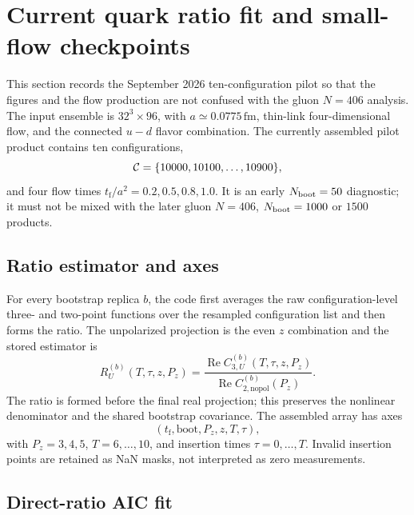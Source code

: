 \documentclass[11pt]{article}
\numberwithin{equation}{section}
\newcommand{\tf}{t_{\mathrm f}}
\begin{document}
\section{Current quark ratio fit and small-flow checkpoints}
\label{sec:current-quark-ratio-fit}

This section records the September 2026 ten-configuration pilot so that the
figures and the flow production are not confused with the gluon \(N=406\)
analysis.  The input ensemble is \(32^3\times96\), with
\(a\simeq0.0775\,\mathrm{fm}\), thin-link four-dimensional flow, and the
connected \(u-d\) flavor combination.  The currently assembled pilot product
contains ten configurations,
\begin{equation}
  {\cal C}=\{10000,10100,\ldots,10900\},
\end{equation}
and four flow times
\(\tf/a^2=0.2,0.5,0.8,1.0\).  It is an early \(N_{\rm boot}=50\)
diagnostic; it must not be mixed with the later gluon \(N=406\),
\(N_{\rm boot}=1000\) or \(1500\) products.

\subsection{Ratio estimator and axes}

For every bootstrap replica \(b\), the code first averages the raw
configuration-level three- and two-point functions over the resampled
configuration list and then forms the ratio.  The unpolarized projection is
the even \(z\) combination and the stored estimator is
\begin{equation}
 R_U^{(b)}(T,\tau,z,P_z)
 =
 \frac{\operatorname{Re} C_{3,U}^{(b)}(T,\tau,z,P_z)}
      {\operatorname{Re} C_{2,\mathrm{nopol}}^{(b)}(P_z)}.
\end{equation}
The ratio is formed before the final real projection; this preserves the
nonlinear denominator and the shared bootstrap covariance.  The assembled
array has axes
\begin{equation}
(\tf,\mathrm{boot},P_z,z,T,\tau),
\end{equation}
with \(P_z=3,4,5\), \(T=6,\ldots,10\), and insertion times
\(\tau=0,\ldots,T\).  Invalid insertion points are retained as NaN masks,
not interpreted as zero measurements.

\subsection{Direct-ratio AIC fit}
\end{document}
